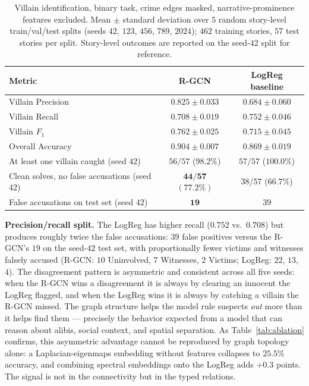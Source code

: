 \documentclass[11pt]{article}
\theoremstyle{definition}
\begin{document}
\begin{table}[h]
\centering
\small
\caption{Villain identification, binary task, crime edges masked, narrative-prominence features excluded. Mean $\pm$ standard deviation over $5$ random story-level train/val/test splits (seeds $42$, $123$, $456$, $789$, $2024$); $462$ training stories, $57$ test stories per split. Story-level outcomes are reported on the seed-$42$ split for reference.}
\label{tab:headline}
\begin{tabular}{lcc}
\toprule
\textbf{Metric} & \textbf{R-GCN} & \textbf{LogReg baseline} \\
\midrule
Villain Precision & $\mathbf{0.825 \pm 0.033}$ & $0.684 \pm 0.060$ \\
Villain Recall & $0.708 \pm 0.019$ & $\mathbf{0.752 \pm 0.046}$ \\
Villain $F_1$ & $\mathbf{0.762 \pm 0.025}$ & $0.715 \pm 0.045$ \\
Overall Accuracy & $\mathbf{0.904 \pm 0.007}$ & $0.869 \pm 0.019$ \\
\midrule
At least one villain caught (seed $42$) & $56/57$ ($98.2\%$) & $57/57$ ($100.0\%$) \\
Clean solves, no false accusations (seed $42$) & $\mathbf{44/57}$ $(\mathbf{77.2\%})$ & $38/57$ ($66.7\%$) \\
False accusations on test set (seed $42$) & $\mathbf{19}$ & $39$ \\
\bottomrule
\end{tabular}
\end{table}

\textbf{Precision/recall split.} The LogReg has higher recall ($0.752$ vs.~$0.708$) but produces roughly twice the false accusations: $39$ false positives versus the R-GCN's $19$ on the seed-$42$ test set, with proportionally fewer victims and witnesses falsely accused (R-GCN: $10$ Uninvolved, $7$ Witnesses, $2$ Victims; LogReg: $22$, $13$, $4$). The disagreement pattern is asymmetric and consistent across all five seeds: when the R-GCN wins a disagreement it is always by clearing an innocent the LogReg flagged, and when the LogReg wins it is always by catching a villain the R-GCN missed. The graph structure helps the model rule suspects \emph{out} more than it helps find them --- precisely the behavior expected from a model that can reason about alibis, social context, and spatial separation. As Table~\ref{tab:ablation} confirms, this asymmetric advantage cannot be reproduced by graph topology alone: a Laplacian-eigenmaps embedding without features collapses to $25.5\%$ accuracy, and combining spectral embeddings onto the LogReg adds $+0.3$ points. The signal is not in the connectivity but in the typed relations.
\end{document}
